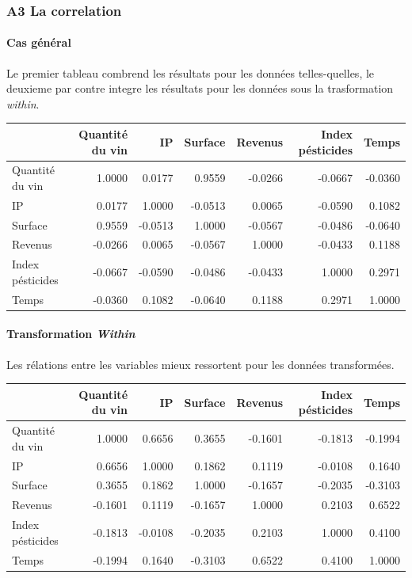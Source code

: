 \documentclass[11pt,]{article}
\let\oldparagraph\paragraph
\renewcommand{\paragraph}[1]{\oldparagraph{#1}\mbox{}}
\begin{document}
\FloatBarrier

\newpage

\hypertarget{a3-la-correlation}{%
\subsubsection{A3 La correlation}\label{a3-la-correlation}}

\hypertarget{cas-general-1}{%
\paragraph{Cas général}\label{cas-general-1}}

Le premier tableau combrend les résultats pour les données
telles-quelles, le deuxieme par contre integre les résultats pour les
données sous la trasformation \emph{within}.

\FloatBarrier

\begin{longtable}[]{@{}lrrrrrr@{}}
\toprule
& Quantité du vin & IP & Surface & Revenus & Index pésticides &
Temps\tabularnewline
\midrule
\endhead
Quantité du vin & 1.0000 & 0.0177 & 0.9559 & -0.0266 & -0.0667 &
-0.0360\tabularnewline
IP & 0.0177 & 1.0000 & -0.0513 & 0.0065 & -0.0590 &
0.1082\tabularnewline
Surface & 0.9559 & -0.0513 & 1.0000 & -0.0567 & -0.0486 &
-0.0640\tabularnewline
Revenus & -0.0266 & 0.0065 & -0.0567 & 1.0000 & -0.0433 &
0.1188\tabularnewline
Index pésticides & -0.0667 & -0.0590 & -0.0486 & -0.0433 & 1.0000 &
0.2971\tabularnewline
Temps & -0.0360 & 0.1082 & -0.0640 & 0.1188 & 0.2971 &
1.0000\tabularnewline
\bottomrule
\end{longtable}

\FloatBarrier

\hypertarget{transformation-within-1}{%
\paragraph{\texorpdfstring{Transformation
\emph{Within}}{Transformation Within}}\label{transformation-within-1}}

Les rélations entre les variables mieux ressortent pour les données
transformées.

\FloatBarrier

\begin{longtable}[]{@{}lrrrrrr@{}}
\toprule
& Quantité du vin & IP & Surface & Revenus & Index pésticides &
Temps\tabularnewline
\midrule
\endhead
Quantité du vin & 1.0000 & 0.6656 & 0.3655 & -0.1601 & -0.1813 &
-0.1994\tabularnewline
IP & 0.6656 & 1.0000 & 0.1862 & 0.1119 & -0.0108 & 0.1640\tabularnewline
Surface & 0.3655 & 0.1862 & 1.0000 & -0.1657 & -0.2035 &
-0.3103\tabularnewline
Revenus & -0.1601 & 0.1119 & -0.1657 & 1.0000 & 0.2103 &
0.6522\tabularnewline
Index pésticides & -0.1813 & -0.0108 & -0.2035 & 0.2103 & 1.0000 &
0.4100\tabularnewline
Temps & -0.1994 & 0.1640 & -0.3103 & 0.6522 & 0.4100 &
1.0000\tabularnewline
\bottomrule
\end{longtable}
\end{document}
